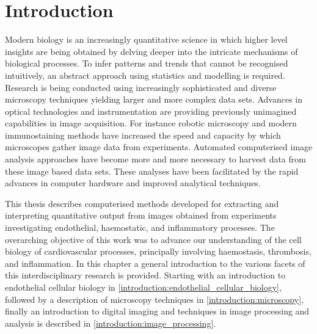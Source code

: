 \chapter{Introduction}
\label{introduction}
\ifpdf
	\graphicspath{{chapter_1/figs/}}
\fi


Modern biology is an increasingly quantitative science in which higher level insights are being obtained by delving deeper into the intricate mechanisms of biological processes. To infer patterns and trends that cannot be recognised intuitively, an abstract approach using statistics and modelling is required. Research is being conducted using increasingly sophisticated and diverse microscopy techniques yielding larger and more complex data sets. Advances in optical technologies and instrumentation are providing previously unimagined capabilities in image acquisition. For instance robotic microscopy and modern immunostaining methods have increased the speed and capacity by which microscopes gather image data from experiments. Automated computerised image analysis approaches have become more and more necessary to harvest data from these image based data sets. These analyses have been facilitated by the rapid advances in computer hardware and improved analytical techniques.

This thesis describes computerised methods developed for extracting and interpreting quantitative output from images obtained from experiments investigating endothelial, haemostatic, and inflammatory processes. The overarching objective of this work was to advance our understanding of the cell biology of cardiovascular processes, principally involving haemostasis, thrombosis, and inflammation. In this chapter a general introduction to the various facets of this interdisciplinary research is provided. Starting with an introduction to endothelial cellular biology in \autoref{introduction:endothelial_cellular_biology}, followed by a description of microscopy techniques in \autoref{introduction:microscopy}, finally an introduction to digital imaging and techniques in image processing and analysis is described in \autoref{introduction:image_processing}.

